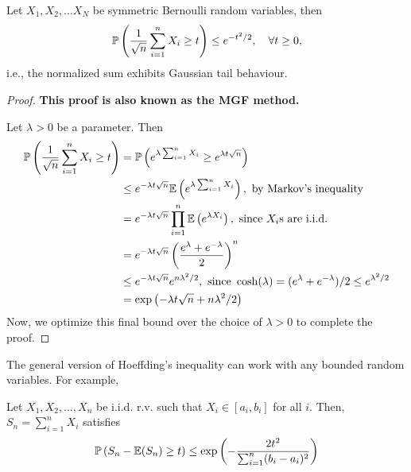 \documentclass[12pt]{article}
\begin{document}
\begin{theorembox}
    Let $X_1, X_2, \dots X_N$ be symmetric Bernoulli random variables, then
    \begin{equation*}
        \mathbb{P}\left(\frac{1}{\sqrt{n}} \sum_{i=1}^{n} X_i \geq t\right) \leq e^{-t^2/2}, \quad \forall t \geq 0,
    \end{equation*}
    \noindent i.e., the normalized sum exhibits Gaussian tail behaviour.
\end{theorembox}
\begin{proof}
    \textbf{This proof is also known as the MGF method.}

    Let $\lambda > 0$ be a parameter. Then
    \begin{align*}
        \mathbb{P}\left( \frac{1}{\sqrt{n}} \sum_{i=1}^{n} X_i \geq t \right)
         & = \mathbb{P}\left(e^{\lambda \sum_{i=1}^{n} X_i} \geq e^{\lambda t \sqrt{n}}\right)                                                   \\
         & \leq e^{-\lambda t \sqrt{n}} \mathbb{E}\left(e^{\lambda \sum_{i=1}^{n} X_i}\right), \text{ by Markov's inequality}                       \\
         & = e^{-\lambda t \sqrt{n}} \prod_{i=1}^{n} \mathbb{E}\left(e^{\lambda X_i}\right), \text{ since } X_i\text{s are i.i.d.}          \\
         & = e^{-\lambda t \sqrt{n}} \left(\frac{e^{\lambda} + e^{-\lambda}}{2}\right)^n                                                    \\
         & \leq e^{-\lambda t \sqrt{n}} e^{n\lambda^2/2}, \text{ since } \cosh(\lambda) = (e^\lambda + e^{-\lambda})/2 \leq e^{\lambda^2/2} \\
         & = \exp\left( -\lambda t \sqrt{n} + n\lambda^2/2 \right)
    \end{align*}
    \noindent Now, we optimize this final bound over the choice of $\lambda > 0$ to complete the proof.
\end{proof}

The general version of Hoeffding's inequality can work with any bounded random variables. For example,

\begin{theorembox}
    Let \( X_1, X_2, \dots, X_n \) be i.i.d. r.v. such that \( X_i \in [a_i, b_i] \) for all $i$. Then, \( S_n = \sum_{i=1}^{n} X_i \) satisfies
    \begin{equation*}
        \mathbb{P}\left( S_n - \mathbb{E}(S_n) \geq t\right) \leq \exp\left(-\frac{2 t^2}{\sum_{i=1}^{n} (b_i - a_i)^2}\right)
    \end{equation*}
\end{theorembox}
\end{document}
